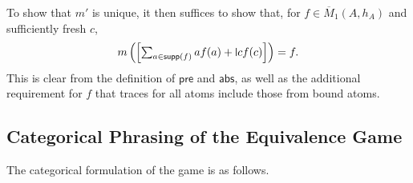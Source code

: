 \documentclass[11pt,a4paper]{amsart}
\newcommand{\pre}{\mathsf{pre}}
\newcommand{\abs}{\mathsf{abs}}
\newcommand{\supp}{\mathsf{supp}}
\newcommand{\mbar}{\overline{M}_1}
\theoremstyle{plain}
\newcommand{\midmid}{\hspace{0.2ex}{\rule[-0.1ex]{0.6pt}{1.65ex}}\hspace{0.2ex}}
\newcommand{\newletter}[1]{{\midmid}#1}
\numberwithin{equation}{section}
\newcommand{\+}[1]{\mathcal{#1}\xspace}
\theoremstyle{definition}
\begin{document}
To show that \(m'\) is unique, it then suffices to show that, for \(f \in \mbar(A, h_A)\) and sufficiently fresh \(c\),
\begin{equation*}\textstyle
  m\left( \left[ \sum_{a \in \supp(f)} a f(a) + \newletter{c} f(c) \right] \right) = f.
\end{equation*}
This is clear from the definition of \(\pre\) and \(\abs\), as well as the additional requirement for \(f\) that traces for all atoms include those from bound atoms.


\subsection*{Categorical Phrasing of the Equivalence Game}

The categorical formulation of the game is as follows.
\end{document}
